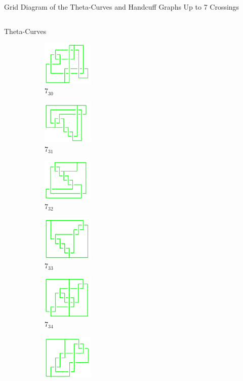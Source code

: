 \documentclass[final]{beamer}
\begin{document}
\begin{frame}[t]
\begin{alertblock}{Grid Diagram of the Theta-Curves and Handcuff Graphs Up to 7 Crossings}
\begin{columns}[t]
\begin{column}{0.6\textwidth}
\begin{alertblock}{Theta-Curves}
\begin{figure}
\begin{subfigure}{0.075\textwidth}
    \includegraphics[width=2.4cm]{../Midterm_Poster/grid_diagram/theta_7_30.png}
    \caption{$7_{30}$}
    \end{subfigure}
    \begin{subfigure}{0.075\textwidth}
    \includegraphics[width=2.4cm]{../Midterm_Poster/grid_diagram/theta_7_31.png}
    \caption{$7_{31}$} 
    \end{subfigure}
    \begin{subfigure}{0.075\textwidth}
    \includegraphics[width=2.4cm]{../Midterm_Poster/grid_diagram/theta_7_32.png}
    \caption{$7_{32}$} 
    \end{subfigure}
    \begin{subfigure}{0.075\textwidth}
    \includegraphics[width=2.4cm]{../Midterm_Poster/grid_diagram/theta_7_33.png}
    \caption{$7_{33}$} 
    \end{subfigure}
    \begin{subfigure}{0.075\textwidth}
    \includegraphics[width=2.4cm]{../Midterm_Poster/grid_diagram/theta_7_34.png}
    \caption{$7_{34}$} 
    \end{subfigure}
    \begin{subfigure}{0.075\textwidth}
    \includegraphics[width=2.4cm]{../Midterm_Poster/grid_diagram/theta_7_35.png}

\end{subfigure}
\end{figure}
\end{alertblock}
\end{column}
\end{columns}
\end{alertblock}
\end{frame}
\end{document}
